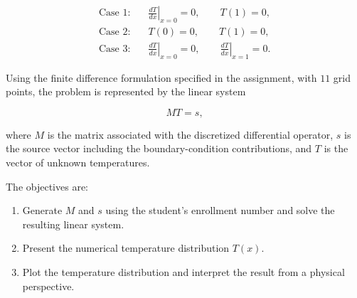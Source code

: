\begin{align*}
    \text{Case 1:}\quad &
    \left.\frac{dT}{dx}\right|_{x=0}=0,
    \qquad T(1)=0,
    \\[4pt]
    \text{Case 2:}\quad &
    T(0)=0,
    \qquad T(1)=0,
    \\[4pt]
    \text{Case 3:}\quad &
    \left.\frac{dT}{dx}\right|_{x=0}=0,
    \qquad
    \left.\frac{dT}{dx}\right|_{x=1}=0.
\end{align*}

Using the finite difference formulation specified in the assignment, with
$11$ grid points, the problem is represented by the linear system

\begin{equation}
    MT=s,
\end{equation}

where $M$ is the matrix associated with the discretized differential operator,
$s$ is the source vector including the boundary-condition contributions, and
$T$ is the vector of unknown temperatures.

The objectives are:

\begin{enumerate}
    \item Generate $M$ and $s$ using the student's enrollment number and solve
          the resulting linear system.
    \item Present the numerical temperature distribution $T(x)$.
    \item Plot the temperature distribution and interpret the result from a
          physical perspective.
\end{enumerate}